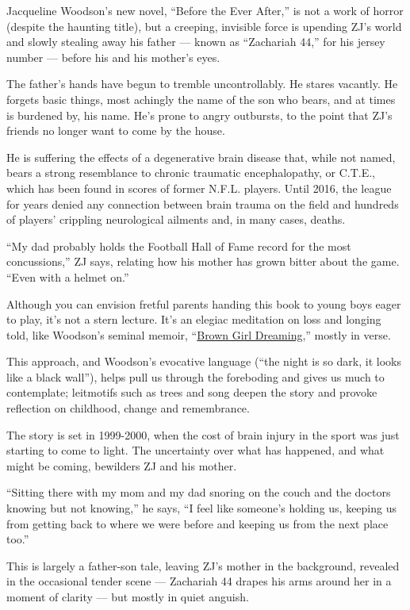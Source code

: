 Jacqueline Woodson's new novel, ``Before the Ever After,'' is not a work
of horror (despite the haunting title), but a creeping, invisible force
is upending ZJ's world and slowly stealing away his father --- known as
``Zachariah 44,'' for his jersey number --- before his and his mother's
eyes.

The father's hands have begun to tremble uncontrollably. He stares
vacantly. He forgets basic things, most achingly the name of the son who
bears, and at times is burdened by, his name. He's prone to angry
outbursts, to the point that ZJ's friends no longer want to come by the
house.

He is suffering the effects of a degenerative brain disease that, while
not named, bears a strong resemblance to chronic traumatic
encephalopathy, or C.T.E., which has been found in scores of former
N.F.L. players. Until 2016, the league for years denied any connection
between brain trauma on the field and hundreds of players' crippling
neurological ailments and, in many cases, deaths.

``My dad probably holds the Football Hall of Fame record for the most
concussions,'' ZJ says, relating how his mother has grown bitter about
the game. ``Even with a helmet on.''

Although you can envision fretful parents handing this book to young
boys eager to play, it's not a stern lecture. It's an elegiac meditation
on loss and longing told, like Woodson's seminal memoir,
``\href{https://www.nytimes3xbfgragh.onion/2014/08/24/books/review/jacqueline-woodsons-brown-girl-dreaming.html}{Brown
Girl Dreaming},'' mostly in verse.

This approach, and Woodson's evocative language (``the night is so dark,
it looks like a black wall''), helps pull us through the foreboding and
gives us much to contemplate; leitmotifs such as trees and song deepen
the story and provoke reflection on childhood, change and remembrance.

The story is set in 1999-2000, when the cost of brain injury in the
sport was just starting to come to light. The uncertainty over what has
happened, and what might be coming, bewilders ZJ and his mother.

``Sitting there with my mom and my dad snoring on the couch and the
doctors knowing but not knowing,'' he says, ``I feel like someone's
holding us, keeping us from getting back to where we were before and
keeping us from the next place too.''

This is largely a father-son tale, leaving ZJ's mother in the
background, revealed in the occasional tender scene --- Zachariah 44
drapes his arms around her in a moment of clarity --- but mostly in
quiet anguish.


